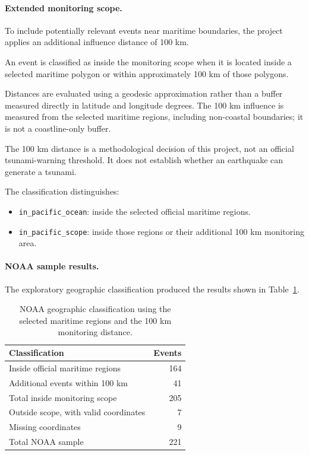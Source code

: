 \documentclass[a4paper,11pt,oneside]{book}
\begin{document}
\paragraph{Extended monitoring scope.}

To include potentially relevant events near maritime boundaries,
the project applies an additional influence distance of 100 km.

An event is classified as inside the monitoring scope when it is
located inside a selected maritime polygon or within approximately
100 km of those polygons.

Distances are evaluated using a geodesic approximation rather than
a buffer measured directly in latitude and longitude degrees.
The 100 km influence is measured from the selected maritime regions,
including non-coastal boundaries; it is not a coastline-only buffer.

The 100 km distance is a methodological decision of this project,
not an official tsunami-warning threshold. It does not establish
whether an earthquake can generate a tsunami.

The classification distinguishes:

\begin{itemize}[nosep]
    \item \texttt{in\_pacific\_ocean}: inside the selected
          official maritime regions.
    \item \texttt{in\_pacific\_scope}: inside those regions or
          their additional 100 km monitoring area.
\end{itemize}

\paragraph{NOAA sample results.}

The exploratory geographic classification produced the results
shown in Table~\ref{tab:pacific-scope}.

\begin{table}[H]
\centering
\begin{tabular}{lr}
\toprule
Classification & Events \\
\midrule
Inside official maritime regions & 164 \\
Additional events within 100 km & 41 \\
Total inside monitoring scope & 205 \\
Outside scope, with valid coordinates & 7 \\
Missing coordinates & 9 \\
\midrule
Total NOAA sample & 221 \\
\bottomrule
\end{tabular}
\caption{NOAA geographic classification using the selected
maritime regions and the 100 km monitoring distance.}
\label{tab:pacific-scope}
\end{table}
\end{document}
